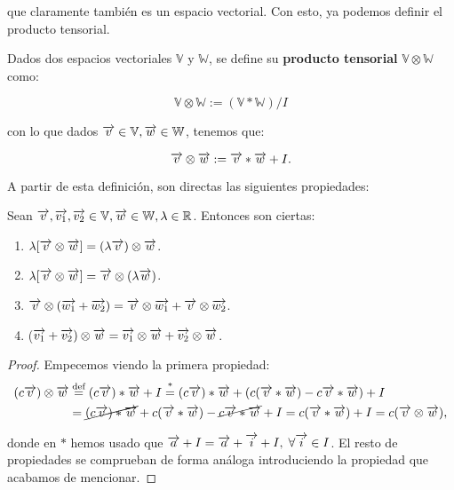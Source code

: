 que claramente también es un espacio vectorial. Con esto, ya podemos definir el producto tensorial.

\begin{definicion}
	Dados dos espacios vectoriales $\mathbb{V}$ y $\mathbb{W}$, se define su \textbf{producto tensorial} $\mathbb{V} \otimes \mathbb{W}$ como:

	$$\mathbb{V} \otimes \mathbb{W} := (\mathbb{V} \ast \mathbb{W}) / I$$

	con lo que dados $\nv{v} \in \mathbb{V}, \nv{w} \in \mathbb{W}$, tenemos que:

	\begin{equation}
		\nv{v} \otimes \nv{w} := \nv{v} \ast \nv{w} + I.
	\end{equation}
\end{definicion}

A partir de esta definición, son directas las siguientes propiedades:

\begin{proposicion} \label{prop:tensores_propiedades}
	Sean $\nv{v}, \nv{v_1}, \nv{v_2} \in \mathbb{V}, \nv{w} \in \mathbb{W}, \lambda \in \R$. Entonces son ciertas:
	\begin{enumerate}
		\item $\lambda [\nv{v} \otimes \nv{w}] = (\lambda \nv{v}) \otimes \nv{w}$.
		\item $\lambda [\nv{v} \otimes \nv{w}] = \nv{v} \otimes (\lambda \nv{w})$.
		\item $\nv{v} \otimes (\nv{w_1} + \nv{w_2}) = \nv{v} \otimes \nv{w_1} + \nv{v} \otimes \nv{w_2}$.
		\item ($\nv{v_1} + \nv{v_2}) \otimes \nv{w} = \nv{v_1} \otimes \nv{w} + \nv{v_2} \otimes \nv{w}$.
	\end{enumerate}
\end{proposicion}

\begin{proof} Empecemos viendo la primera propiedad:
	\begin{equation}
		\begin{split}
			(c\nv{v}) \otimes \nv{w} &\eqtext{def} (c\nv{v}) \ast \nv{w} + I \encima{=}{\text{*}} (c\nv{v}) \ast \nv{w} + (c(\nv{v} \ast \nv{w}) - c\nv{v} \ast \nv{w}) + I \\
            &= \cancel{(c\nv{v}) \ast \nv{w}} + c(\nv{v} \ast \nv{w}) - \cancel{c\nv{v} \ast \nv{w}} + I = c(\nv{v} \ast \nv{w}) + I = c (\nv{v} \otimes \nv{w}),
		\end{split}
	\end{equation}

    donde en $\text{*}$ hemos usado que $\nv{a} + I = \nv{a} + \nv{i} + I, \; \forall \nv{i} \in I$. El resto de propiedades se comprueban de forma análoga introduciendo la propiedad que acabamos de mencionar.

\end{proof}

